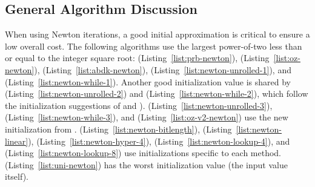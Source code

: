 











\subsection{General Algorithm Discussion}

When using Newton iterations,
a good initial approximation is critical to ensure a low overall cost.
The following algorithms use the largest power-of-two less than or equal
to the integer square root:
\prb{} (Listing~\ref{list:prb-newton}),
\OpenZeppelin{} (Listing~\ref{list:oz-newton}),
\abdk{} (Listing~\ref{list:abdk-newton}),
\UnrolledOne{} (Listing~\ref{list:newton-unrolled-1}), and
\WhileOne{} (Listing~\ref{list:newton-while-1}).
Another good initialization value is shared by
\UnrolledTwo{} (Listing~\ref{list:newton-unrolled-2}) and
\WhileTwo{} (Listing~\ref{list:newton-while-2}),
which follow the initialization suggestions of
\cite[Chapter 1.7, Remarks (2)]{cohen1993} and
\cite[Algorithm 9.2.11]{PrimeNumbersACP2005}).
\UnrolledThree{} (Listing~\ref{list:newton-unrolled-3}),
\WhileThree{} (Listing~\ref{list:newton-while-3}), and
\OpenZeppelinTwo{} (Listing~\ref{list:oz-v2-newton})
use the new initialization from \cite{EfficientIsqrt}.
\BitLength{} (Listing~\ref{list:newton-bitlength}),
\Linear{} (Listing~\ref{list:newton-linear}),
\HyperFour{} (Listing~\ref{list:newton-hyper-4}),
\LookupFour{} (Listing~\ref{list:newton-lookup-4}), and
\LookupEight{} (Listing~\ref{list:newton-lookup-8})
use initializations specific to each method.
\Uniswap{} (Listing~\ref{list:uni-newton}) has the worst
initialization value (the input value itself).
